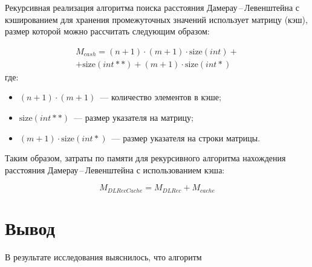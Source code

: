 Рекурсивная реализация алгоритма поиска расстояния Дамерау\,--\,Левенштейна с кэшированием для хранения промежуточных значений использует матрицу (кэш), размер которой можно рассчитать следующим образом:

\begin{multline}
	M_{cash} = (n + 1) \cdot (m + 1) \cdot \text{size}(int) +\\+ \text{size}(int **) + (m + 1) \cdot \text{size}(int *)
\end{multline}
где:
\begin{itemize}
    \item $(n + 1) \cdot (m + 1)$~--- количество элементов в кэше;
	\item $\text{size}(int **)$~--- размер указателя на матрицу;
	\item $(m + 1) \cdot \text{size}(int *)$~--- размер указателя на строки матрицы.
\end{itemize}

Таким образом, затраты по памяти для рекурсивного алгоритма нахождения расстояния Дамерау\,--\,Левенштейна с использованием кэша:

\begin{equation}
    M_{DLRecCache} = M_{DLRec} + M_{cache}
\end{equation}

\section{Вывод}

В результате исследования выяснилось, что алгоритм 
